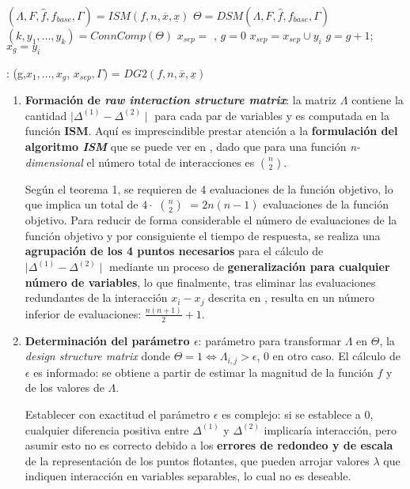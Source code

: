 \begin{algorithm}[h]
	\begin{algorithmic}[1]
		\STATE $(\Lambda, F , \hat{f}, f_{base}, \Gamma) = ISM(f,n,  \overline{x}, \underline{x})$
		\STATE $\Theta = DSM(\Lambda, F , \hat{f}, f_{base}, \Gamma)$
		\STATE $(k, y_1,...,y_k)=ConnComp(\Theta)$
		\STATE $x_{sep} = {}$ , $g = 0$
		\STATE $x_{sep} = x_{sep} \cup y_i$
		\ELSE
		\STATE $g = g +1$; $x_g = y_i$
		\ENDIF
		\ENDFOR
	\end{algorithmic}
	\caption{: (g,$x_1,...,x_g$, $x_{sep},\Gamma$) = $DG2(f, n, \overline{x}, \underline{x})$} \label{Alg: DG2}
\end{algorithm}

\begin{enumerate}
	\item \textbf{Formación de \textit{raw interaction structure matrix}}: la matriz $\Lambda$ contiene la cantidad $\mid \Delta^{(1)} - \Delta^{(2)}\mid$ para cada par de variables y es computada en la función \textbf{ISM}. Aquí es imprescindible prestar atención a la \textbf{formulación del algoritmo \textit{ISM}} que se puede ver en \cite{DG2}, dado que para una función \textit{n-dimensional} el número total de interacciones es $n \choose 2$.
	
	Según el teorema 1, se requieren de 4 evaluaciones de la función objetivo, lo que implica un total de  $4\cdot$ $n \choose 2$ $= 2n(n-1)$ evaluaciones de la función objetivo. Para reducir de forma considerable el número de evaluaciones de la función objetivo y por consiguiente el tiempo de respuesta, se realiza una \textbf{agrupación de los 4 puntos necesarios} para el cálculo de $\mid \Delta^{(1)} - \Delta^{(2)}\mid$ mediante un proceso de \textbf{generalización para cualquier número de variables}, lo que finalmente, tras eliminar las evaluaciones redundantes de la interacción $x_i - x_j$ descrita en \cite{DG2}, resulta en un número inferior de evaluaciones: $\frac{n(n+1)}{2}+1$.
	
	\item \textbf{Determinación del parámetro $\epsilon$}: parámetro para transformar $\Lambda$ en $\Theta$, la \textit{design structure matrix} donde $\Theta = 1 \iff \Lambda_{i,j} > \epsilon$, 0 en otro caso. El cálculo de $\epsilon$ es informado: se obtiene a partir de estimar la magnitud de la función $f$ y de los valores de $\Lambda$.
	
	Establecer con exactitud el parámetro $\epsilon$ es complejo: si se establece a 0, cualquier diferencia positiva entre $\Delta^{(1)}$ y $\Delta^{(2)}$ implicaría interacción, pero asumir esto no es correcto debido a los \textbf{errores de redondeo y de escala} de la representación de los puntos flotantes, que pueden arrojar valores $\lambda$ que indiquen interacción en variables separables, lo cual no es deseable.
	

\end{enumerate}
